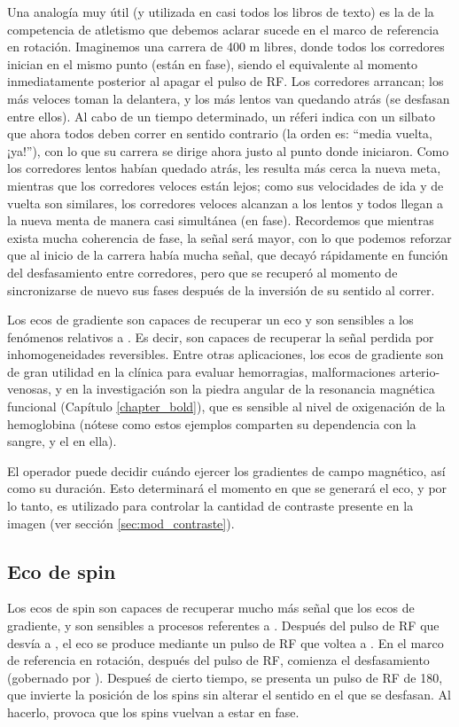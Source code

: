 Una analogía muy útil (y utilizada en casi todos los libros de texto) es la de la competencia de atletismo que debemos aclarar sucede en el marco de referencia en rotación. Imaginemos una carrera de 400 m libres, donde todos los corredores inician en el mismo punto (están en fase), siendo el equivalente al momento inmediatamente posterior al apagar el pulso de RF. Los corredores arrancan; los más veloces toman la delantera, y los más lentos van quedando atrás (se desfasan entre ellos). Al cabo de un tiempo determinado, un réferi indica con un silbato que ahora todos deben correr en sentido contrario (la orden es: ``media vuelta, ¡ya!''), con lo que su carrera se dirige ahora justo al punto donde iniciaron. Como los corredores lentos habían quedado atrás, les resulta más cerca la nueva meta, mientras que los corredores veloces están lejos; como sus velocidades de ida y de vuelta son similares, los corredores veloces alcanzan a los lentos y todos llegan a la nueva menta de manera casi simultánea (en fase). Recordemos que mientras exista mucha coherencia de fase, la señal será mayor, con lo que podemos reforzar que al inicio de la carrera había mucha señal, que decayó rápidamente en función del desfasamiento entre corredores, pero que se recuperó al momento de sincronizarse de nuevo sus fases después de la inversión de su sentido al correr.


Los ecos de gradiente son capaces de recuperar un eco y son sensibles a los fenómenos relativos a \Ttwostar. Es decir, son capaces de recuperar la señal perdida por inhomogeneidades reversibles. Entre otras aplicaciones, los ecos de gradiente son de gran utilidad en la clínica para evaluar hemorragias, malformaciones arterio-venosas, y en la investigación son la piedra angular de la resonancia magnética funcional (Capítulo \ref{chapter_bold}), que es sensible al nivel de oxigenación de la hemoglobina (nótese como estos ejemplos comparten su dependencia con la sangre, y el  en ella).

El operador puede decidir cuándo ejercer los gradientes de campo magnético, así como su duración. Esto determinará el momento en que se generará el eco, y por lo tanto, es utilizado para controlar la cantidad de contraste \Ttwostar presente en la imagen (ver sección \ref{sec:mod_contraste}).


\subsection{Eco de spin}
Los ecos de spin son capaces de recuperar mucho más señal que los ecos de gradiente, y son sensibles a procesos referentes a \Ttwo. Después del pulso de RF que desvía a \M, el eco se produce mediante un pulso de RF que voltea a \degrees. En el marco de referencia en rotación, después del pulso de RF, comienza el desfasamiento (gobernado por \Ttwo). Despueś de cierto tiempo, se presenta un pulso de RF de 180\degrees, que invierte la posición de los spins sin alterar el sentido en el que se desfasan. Al hacerlo, provoca que los spins vuelvan a estar en fase. 

